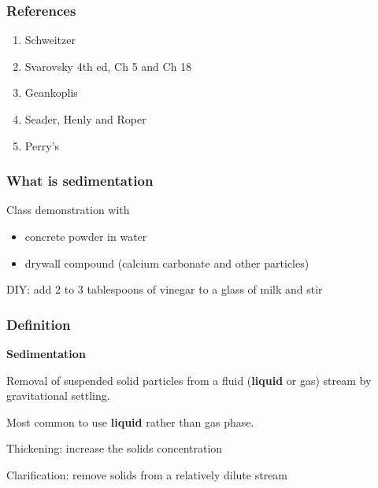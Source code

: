 \begin{comment}
And Perry's section 22.5.7

edimentation Tanks These tanks are an integral part of any activated-sludge system. It is essential to separate the suspended solids from the treated liquid if a high-quality effluent is to be produced. Circular sedimentation tanks with various types of hydraulic sludge collectors have become the standard secondary sedimentation system. Square tanks have been used with commonwall construction for compact design with multiple tanks. Most secondary sedimentation tanks use center-feed inlets and peripheral-weir outlets. Recently, efforts have been made to employ peripheral inlets with submerged-orifice flow controllers and either center-weir outlets or peripheral-weir outlets adjacent to the peripheral-inlet channel.

\end{comment}

\begin{frame}\frametitle{References}
	\begin{enumerate}
		\item	Schweitzer
		\item	Svarovsky 4th ed, Ch 5 and Ch 18
		\item	Geankoplis
		\item	Seader, Henly and Roper
		\item	Perry's
		
	\end{enumerate}
\end{frame}

\begin{frame}\frametitle{What is sedimentation}
	Class demonstration with
	\begin{itemize}
		\item	concrete powder in water
		\item	drywall compound (calcium carbonate and other particles)
	\end{itemize}

	\vspace{12pt}
	DIY: add 2 to 3 tablespoons of vinegar to a glass of milk and stir	
\end{frame}

\begin{frame}\frametitle{Definition}
	
	\textbf{Sedimentation}
	
	Removal of suspended solid particles from a fluid (\textbf{liquid} or gas) stream by gravitational settling.
	
	\vspace{12pt}
	
	Most common to use \textbf{liquid} rather than gas phase.
	
	\vspace{12pt}
	
	Thickening: increase the solids concentration
	
	Clarification: remove solids from a relatively dilute stream
	
\end{frame}

